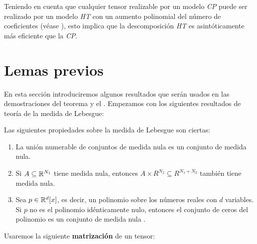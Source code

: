 Teniendo en cuenta que cualquier tensor realizable por un modelo \textit{CP} puede ser realizado por un modelo \textit{HT} con un aumento polinomial del número de coeficientes (véase ), esto implica que la descomposición \textit{HT} es asintóticamente más eficiente que la \textit{CP}.

\section{Lemas previos} \label{sec:lemas_previos}

En esta sección introduciremos algunos resultados que serán usados en las demostraciones del teorema  y el . Empezamos con los siguientes resultados de teoría de la medida de Lebesgue:

\begin{lema} \label{lema:prop_fundamentales_medida} Las siguientes propiedades sobre la medida de Lebesgue son ciertas:

\begin{enumerate}
    \item La unión numerable de conjuntos de medida nula es un conjunto de medida nula.
    \item Si $A \subseteq \mathbb{R}^{N_1}$ tiene medida nula, entonces $A \times R^{N_2} \subseteq R^{N_1 + N_2}$ también tiene medida nula.
    \item Sea $p \in \mathbb{R}^d[x]$, es decir, un polinomio sobre los números reales con $d$ variables. Si $p$ no es el polinomio idénticamente nulo, entonces el conjunto de ceros del polinomio es un conjunto de medida nula \cite{informatica:zeros_of_polynomial}.
\end{enumerate}

\end{lema}

Usaremos la siguiente \textbf{matrización} de un tensor:


